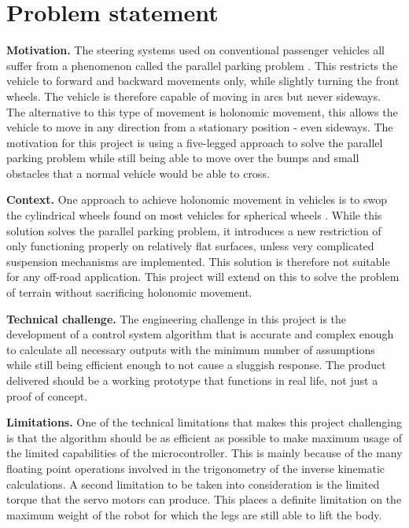 
\section{Problem statement}

\textbf{Motivation.}
The steering systems used on conventional passenger vehicles all suffer from a phenomenon called the parallel parking problem \cite{parallel:1}. This restricts the vehicle  to  forward and backward movements only, while slightly turning the front wheels. The vehicle is therefore capable of moving in arcs but never sideways. The alternative to this type of movement is holonomic movement, this allows the vehicle to move in any direction from a stationary position - even sideways.  The motivation for this project is using a five-legged approach to solve the parallel parking problem while still being able to move over the bumps and small obstacles that a normal vehicle would be able to cross.

\textbf{Context.}
One approach to achieve holonomic movement in vehicles is to swop the cylindrical wheels found on most vehicles for spherical wheels \cite{Omni:1}. While this solution solves the parallel parking problem, it introduces  a new restriction of only functioning properly on relatively flat surfaces, unless very complicated suspension mechanisms are implemented. This solution is therefore not suitable for any off-road application. This project will extend on this to solve the problem of terrain without sacrificing holonomic movement.

\textbf{Technical challenge.}
The engineering challenge in this project is the development of a control system algorithm that is accurate and complex enough to calculate all necessary outputs with the minimum number of assumptions while still being efficient enough to not cause a sluggish response. The product delivered should be a working prototype that functions in real life, not just a proof of concept.

\textbf{Limitations.}
One of the technical limitations that makes this project challenging is that the algorithm should be as efficient as possible to make maximum usage of the limited capabilities of the microcontroller. This is mainly because of the many floating point operations involved in the trigonometry of the inverse kinematic calculations. A second limitation to be taken into consideration is the limited torque that the servo motors can produce. This places a definite limitation on the maximum weight of the robot for which the legs are still able to lift the body. 




